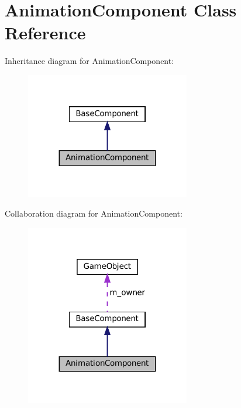 \hypertarget{classAnimationComponent}{}\section{Animation\+Component Class Reference}
\label{classAnimationComponent}


Inheritance diagram for Animation\+Component\+:\nopagebreak
\begin{figure}[H]
\begin{center}
\leavevmode
\includegraphics[width=203pt]{classAnimationComponent__inherit__graph}
\end{center}
\end{figure}


Collaboration diagram for Animation\+Component\+:\nopagebreak
\begin{figure}[H]
\begin{center}
\leavevmode
\includegraphics[width=203pt]{classAnimationComponent__coll__graph}
\end{center}
\end{figure}
